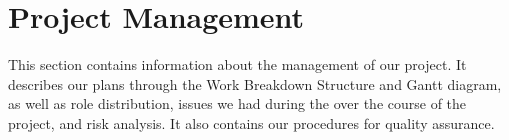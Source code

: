 \chapter{Project Management}
This section contains information about the management of our project. It describes our plans through the Work Breakdown Structure and Gantt diagram, as well as role distribution, issues we had during the over the course of the project, and risk analysis. It also contains our procedures for quality assurance.

